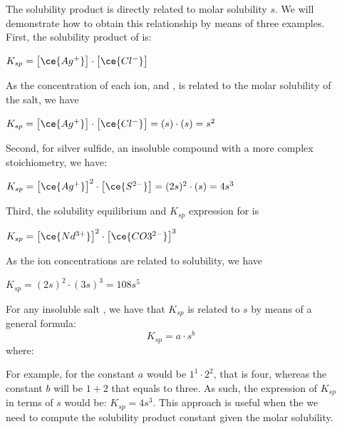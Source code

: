 \documentclass[main.tex]{subfiles}
\newcommand\chapterlabel{soluble}
\begin{document}
\begin{description}
\item[] The solubility product is directly related to molar solubility $s$. We will demonstrate how to obtain this relationship by means of three examples.
First, the solubility product of  is:
\begin{center}\hfill $K_{sp}= \big[ \ce{Ag^{+}} \big]\cdot \big[ \ce{Cl^{-}} \big]$\end{center}
As the concentration of each ion,  and , is related to the molar solubility of the salt, we have
\begin{center}$K_{sp}= \big[ \ce{Ag^{+}} \big]\cdot \big[ \ce{Cl^{-}} \big]=(s)\cdot(s)=s^2$\end{center}
Second, for silver sulfide, an insoluble compound with a more complex stoichiometry, we have:
\begin{center}\hfill $K_{sp}= \big[ \ce{Ag^{+}} \big]^2\cdot \big[ \ce{S^{2-}} \big]=(2s)^2\cdot(s)=4s^3 $\end{center}
Third, the solubility equilibrium and $K_{sp}$ expression for  is
\begin{center}\hfill $K_{sp}= \big[ \ce{Nd^{3+}} \big]^2\cdot \big[ \ce{CO3^{2-}} \big]^3$\end{center}
As the ion concentrations are related to solubility, we have
\begin{center}$K_{sp}=(2s)^2\cdot(3s)^3=108s^5 $\end{center}

\item[] For any insoluble salt , we have that $K_{sp}$ is related to $s$ by means of a general formula:
\begin{equation}
\boxed{ K_{sp}= a\cdot s^b  }\label{\chapterlabel:equation2}
\end{equation}
where:
For example, for  the constant $a$ would be $1^1\cdot 2^2$, that is four, whereas the constant $b$ will be $1+2$ that equals to three. As such, the expression of $K_{sp}$ in terms of $s$ would be: $K_{sp}=4s^3$. This approach is useful when the we need to compute the solubility product constant given the molar solubility.


\end{description}
\end{document}
